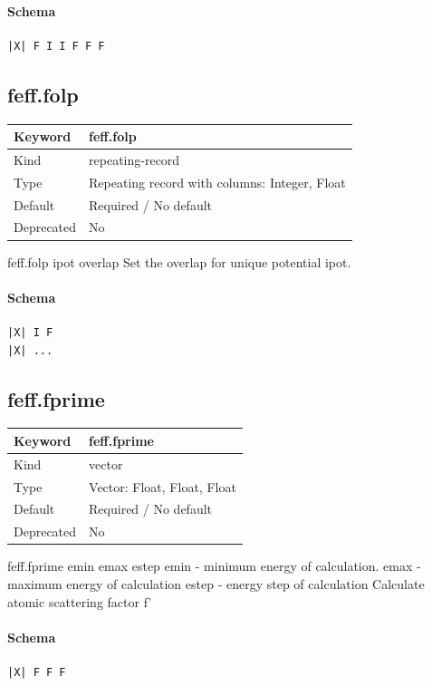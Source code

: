 \documentclass[11pt]{article}
\begin{document}
{{{\paragraph{Schema}
\begin{Verbatim}
|X| F I I F F F
\end{Verbatim}

\subsection{feff.folp}
\label{kw:feff-folp}
\begin{longtable}{|p{1.5in}|p{4.5in}|}
\hline
Keyword & feff.folp \\
\hline
Kind & repeating-record \\
\hline
Type & Repeating record with columns: Integer, Float \\
\hline
Default & Required / No default \\
\hline
Deprecated & No \\
\hline
\end{longtable}
 feff.folp{ ipot overlap }
 Set the overlap for unique potential ipot.

\paragraph{Schema}
\begin{Verbatim}
|X| I F
|X| ...
\end{Verbatim}

\subsection{feff.fprime}
\label{kw:feff-fprime}
\begin{longtable}{|p{1.5in}|p{4.5in}|}
\hline
Keyword & feff.fprime \\
\hline
Kind & vector \\
\hline
Type & Vector: Float, Float, Float \\
\hline
Default & Required / No default \\
\hline
Deprecated & No \\
\hline
\end{longtable}
 feff.fprime{ emin emax estep }
 emin  - minimum energy of calculation.
 emax  - maximum energy of calculation
 estep - energy step of calculation
 Calculate atomic scattering factor f'

\paragraph{Schema}
\begin{Verbatim}
|X| F F F
\end{Verbatim}

}}}
\end{document}

